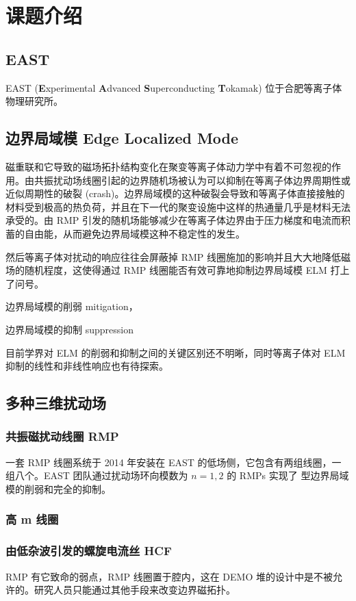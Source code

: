 \chapter{课题介绍}

\section{EAST}
EAST (\textbf{E}xperimental \textbf{A}dvanced \textbf{S}uperconducting \textbf{T}okamak) 位于合肥等离子体物理研究所。

\section{边界局域模 Edge Localized Mode}
磁重联和它导致的磁场拓扑结构变化在聚变等离子体动力学中有着不可忽视的作用。由共振扰动场线圈引起的边界随机场被认为可以抑制在等离子体边界周期性或近似周期性的破裂 (crash)。边界局域模的这种破裂会导致和等离子体直接接触的材料受到极高的热负荷，并且在下一代的聚变设施中这样的热通量几乎是材料无法承受的。由 RMP 引发的随机场能够减少在等离子体边界由于压力梯度和电流而积蓄的自由能，从而避免边界局域模这种不稳定性的发生。

然后等离子体对扰动的响应往往会屏蔽掉 RMP 线圈施加的影响并且大大地降低磁场的随机程度，这使得通过 RMP 线圈能否有效可靠地抑制边界局域模 ELM 打上了问号。

边界局域模的削弱 mitigation，

边界局域模的抑制 suppression

目前学界对 ELM 的削弱和抑制之间的关键区别还不明晰，同时等离子体对 ELM 抑制的线性和非线性响应也有待探索。

\section{多种三维扰动场}
\subsection{共振磁扰动线圈 RMP}

一套 RMP 线圈系统于 2014 年安装在 EAST 的低场侧，它包含有两组线圈，一组八个。EAST 团队通过扰动场环向模数为 $n=1, 2$ 的 RMPs 实现了  型边界局域模的削弱和完全的抑制。
\subsection{高 m 线圈}

\subsection{由低杂波引发的螺旋电流丝 HCF}
RMP 有它致命的弱点，RMP 线圈置于腔内，这在 DEMO 堆的设计中是不被允许的。研究人员只能通过其他手段来改变边界磁拓扑。 
